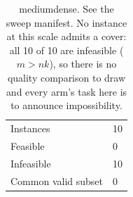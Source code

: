 \begin{table}[tb]
\centering
\caption{mediumdense. See the sweep manifest. No instance at this scale admits a cover: all 10 of 10 are infeasible ($m > nk$), so there is no quality comparison to draw and every arm's task here is to announce impossibility.}
\label{tab:cmp-mediumdense}
\begin{tabular}{ll}
\toprule
Instances & 10 \\
Feasible & 0 \\
Infeasible & 10 \\
Common valid subset & 0 \\
\bottomrule
\end{tabular}
\end{table}
